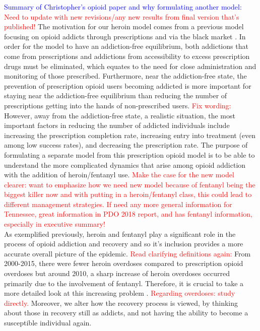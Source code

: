 \documentclass[12pt]{article}
\begin{document}
\textcolor{blue}{Summary of Christopher's opioid paper and why formulating another model:} \\
\textcolor{red}{Need to update with new revisions/any new results from final version that's published!} The motivation for our heroin model comes from a previous model focusing on opioid addicts through prescriptions and via the black market \cite{Battista}. In order for the model to have an addiction-free equilibrium, both addictions that come from prescriptions and addictions from accessibility to excess prescription drugs must be eliminated, which equates to the need for close administration and monitoring of those prescribed. Furthermore, near the addiction-free state, the prevention of prescription opioid users becoming addicted is more important for staying near the addiction-free equilibrium than reducing the number of prescriptions getting into the hands of non-prescribed users. \textcolor{red}{Fix wording:} However, away from the addiction-free state, a realistic situation, the most important factors in reducing the number of addicted individuals include increasing the prescription completion rate, increasing entry into treatment (even among low success rates), and decreasing the prescription rate. The purpose of formulating a separate model from this prescription opioid model is to be able to understand the more complicated dynamics that arise among opioid addiction with the addition of heroin/fentanyl use. \textcolor{red}{Make the case for the new model clearer: want to emphasize how we need new model because of fentanyl being the biggest killer now and with putting in a heroin/fentanyl class, this could lead to different management strategies.} \textcolor{red}{If need any more general information for Tennessee, great information in PDO 2018 report, and has fentanyl information, especially in executive summary!} \\As exemplified previously, heroin and fentanyl play a significant role in the process of opioid addiction and recovery and so it's inclusion provides a more accurate overall picture of the epidemic. \textcolor{red}{Read clarifying definitions again:} From 2000-2015, there were fewer heroin overdoses compared to prescription opioid overdoses but around 2010, a sharp increase of heroin overdoses occurred primarily due to the involvement of fentanyl. Therefore, it is crucial to take a more detailed look at this increasing problem \cite{CDC4}. \textcolor{red}{Regarding overdoses: study directly.} Moreover, we alter how the recovery process is viewed, by thinking about those in recovery still as addicts, and not having the ability to become a susceptible individual again. 
\end{document}
